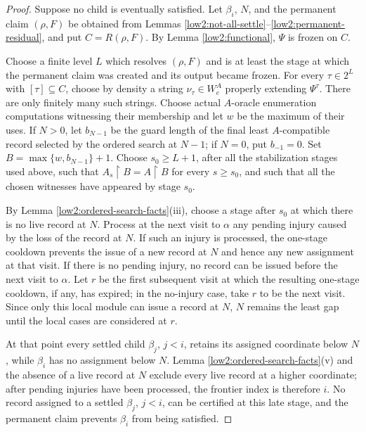 \documentclass[11pt]{amsart}
\begin{document}
\begin{proof}
Suppose no child is eventually satisfied. Let $\beta_i$, $N$, and the
permanent claim $(\rho,F)$ be obtained from Lemmas
\ref{low2:not-all-settle}--\ref{low2:permanent-residual}, and put
$C=R(\rho,F)$. By Lemma \ref{low2:functional}, $\Psi$ is frozen on $C$.

Choose a finite level $L$ which resolves $(\rho,F)$ and is at least the stage
at which the permanent claim was created and its output became frozen. For every
$\tau\in2^L$ with $[\tau]\subseteq C$, choose by density a string $\nu_\tau\in W_e^A$ properly extending $\Psi^\tau$.
There are only finitely many such strings. Choose actual $A$-oracle
enumeration computations witnessing their membership and let $w$ be the
maximum of their uses. If $N>0$, let $b_{N-1}$ be the guard length of the
final least $A$-compatible record selected by the ordered search at $N-1$;
if $N=0$, put $b_{-1}=0$. Set $B=\max\{w,b_{N-1}\}+1$.
Choose $s_0\geq L+1$, after all the stabilization stages used above, such
that $A_s\upharpoonright B=A\upharpoonright B$ for every $s\geq s_0$,
and such that all the chosen witnesses have appeared by stage $s_0$.

By Lemma \ref{low2:ordered-search-facts}(iii), choose a stage after $s_0$ at
which there is no live record at $N$. Process at the next visit to $\alpha$ any
pending injury caused by the loss of the record at $N$. If such an injury is
processed, the one-stage cooldown prevents the issue of a new record at $N$
and hence any new assignment at that visit. If there is no pending injury, no
record can be issued before the next visit to $\alpha$. Let $r$ be the first
subsequent visit at which the resulting one-stage cooldown, if any, has
expired; in the no-injury case, take $r$ to be the next visit. Since only this
local module can issue a record at $N$, $N$ remains the least gap until the
local cases are considered at $r$.

At that point every settled child $\beta_j$, $j<i$, retains its assigned
coordinate below $N$, while $\beta_i$ has no assignment below $N$. Lemma
\ref{low2:ordered-search-facts}(v) and the absence of a live record at $N$
exclude every live record at a higher coordinate; after pending injuries have been
processed, the frontier index is therefore $i$. No record assigned to a
settled $\beta_j$, $j<i$, can be certified at this late stage, and the
permanent claim prevents $\beta_i$ from being satisfied.


\end{proof}
\end{document}
